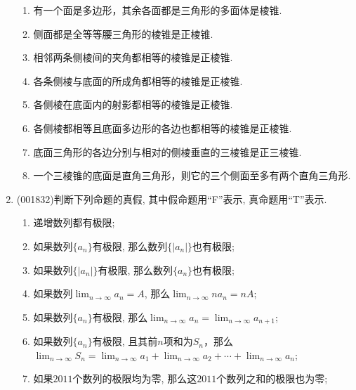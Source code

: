 \documentclass[10pt,a4paper]{article}
\newcommand{\blank}[1]{\underline{\hbox to #1pt{}}}
\begin{document}
\begin{enumerate}[1.]
\begin{enumerate}[\blank{30}(1)]
\item 有一个面是多边形，其余各面都是三角形的多面体是棱锥.\\ 
\item 侧面都是全等等腰三角形的棱锥是正棱锥.\\ 
\item 相邻两条侧棱间的夹角都相等的棱锥是正棱锥.\\ 
\item 各条侧棱与底面的所成角都相等的棱锥是正棱锥.\\ 
\item 各侧棱在底面内的射影都相等的棱锥是正棱锥.\\ 
\item 各侧棱都相等且底面多边形的各边也都相等的棱锥是正棱锥.\\ 
\item 底面三角形的各边分别与相对的侧棱垂直的三棱锥是正三棱锥.\\ 
\item 一个三棱锥的底面是直角三角形，则它的三个侧面至多有两个直角三角形.
\end{enumerate}
\item {\tiny (001832)}判断下列命题的真假, 其中假命题用``F''表示, 真命题用``T''表示.\\ 
\begin{enumerate}[\blank{20}(1)]
\item 递增数列都有极限;\\ 
\item 如果数列$\{a_n\}$有极限, 那么数列$\{|a_n|\}$也有极限;\\ 
\item 如果数列$\{|a_n|\}$有极限, 那么数列$\{a_n\}$也有极限;\\ 
\item 如果数列$\displaystyle\lim_{n\rightarrow \infty} a_n=A$, 那么$\displaystyle\lim_{n\rightarrow \infty} na_n=nA$;\\ 
\item 如果数列$\{a_n\}$有极限, 那么$\displaystyle\lim_{n\rightarrow \infty} a_n=\displaystyle\lim_{n\rightarrow \infty} a_{n+1}$;\\ 
\item 如果数列$\{a_n\}$有极限, 且其前$n$项和为$S_n$，那么$\displaystyle\lim_{n\rightarrow \infty} S_n=\displaystyle\lim_{n\rightarrow \infty} a_{1}+\displaystyle\lim_{n\rightarrow \infty} a_{2}+\cdots+\displaystyle\lim_{n\rightarrow \infty} a_{n}$;\\ 
\item 如果$2011$个数列的极限均为零, 那么这$2011$个数列之和的极限也为零;\\ 

\end{enumerate}
\end{enumerate}
\end{document}
